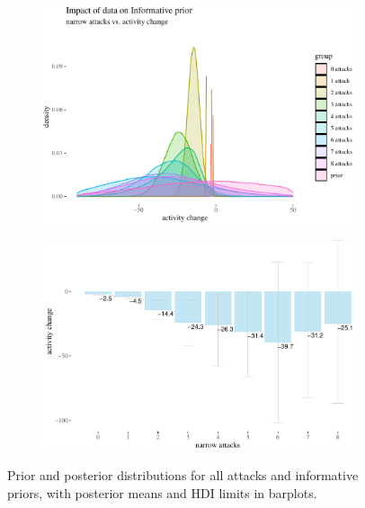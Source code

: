 \documentclass[10pt,]{scrartcl}
\begin{document}
\begin{figure}[!ht]
\begin{subfigure}[!ht]{0.9\textwidth}

\begin{center}\includegraphics[width=1\linewidth]{redditAnalysisWalkthrough_files/figure-latex/unnamed-chunk-62-1} \end{center}
\end{subfigure} 


\begin{subfigure}[!ht]{0.9\textwidth}

\begin{center}\includegraphics[width=1\linewidth]{redditAnalysisWalkthrough_files/figure-latex/unnamed-chunk-63-1} \end{center}
\end{subfigure}

\caption{Prior and posterior distributions for all attacks and informative priors, with posterior means and HDI limits in barplots.}
\label{fig:bayesian3}
\end{figure}
\end{document}
